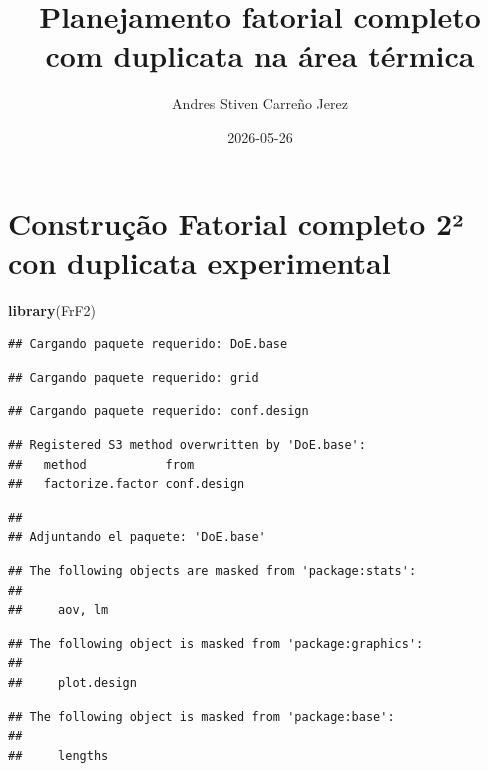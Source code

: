 \documentclass[
]{article}
\title{Planejamento fatorial completo com duplicata na área térmica}
\author{Andres Stiven Carreño Jerez}
\date{2026-05-26}
\newenvironment{Shaded}{\begin{snugshade}}{\end{snugshade}}
\newcommand{\FunctionTok}[1]{\textcolor[rgb]{0.13,0.29,0.53}{\textbf{#1}}}
\newcommand{\NormalTok}[1]{#1}
\begin{document}
\maketitle

\section{Construção Fatorial completo 2² con duplicata
experimental}\label{construuxe7uxe3o-fatorial-completo-2uxb2-con-duplicata-experimental}

\begin{Shaded}
\begin{Highlighting}[]
\FunctionTok{library}\NormalTok{(FrF2)}
\end{Highlighting}
\end{Shaded}

\begin{verbatim}
## Cargando paquete requerido: DoE.base
\end{verbatim}

\begin{verbatim}
## Cargando paquete requerido: grid
\end{verbatim}

\begin{verbatim}
## Cargando paquete requerido: conf.design
\end{verbatim}

\begin{verbatim}
## Registered S3 method overwritten by 'DoE.base':
##   method           from       
##   factorize.factor conf.design
\end{verbatim}

\begin{verbatim}
## 
## Adjuntando el paquete: 'DoE.base'
\end{verbatim}

\begin{verbatim}
## The following objects are masked from 'package:stats':
## 
##     aov, lm
\end{verbatim}

\begin{verbatim}
## The following object is masked from 'package:graphics':
## 
##     plot.design
\end{verbatim}

\begin{verbatim}
## The following object is masked from 'package:base':
## 
##     lengths
\end{verbatim}
\end{document}
